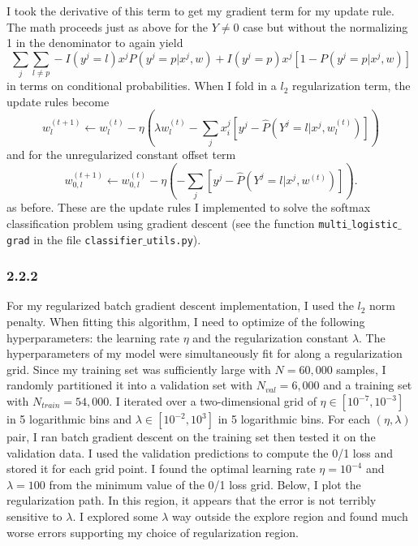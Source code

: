 \documentclass[12pt]{amsart}
\begin{document}
I took the derivative of this term to get my gradient term for my update rule.  The math proceeds just as above for the $Y \neq 0$ case but without the normalizing 1 in the denominator to again yield
\begin{equation}
\sum_j \sum_{l \neq p} -I(y^j = l) x^j P(y^j = p | x^j, w) + I(y^j = p) x^j \left[1 - P(y^j = p | x^j, w) \right]
\end{equation}
in terms on conditional probabilities.  When I fold in a $l_2$ regularization term, the update rules become
 \begin{equation}
w^{(t+1)}_l \leftarrow w^{(t)}_l - \eta (\lambda w^{(t)}_l - \sum_j x^j_i[y^j - \hat{P}(Y^j = l | x^j, w_l^{(t)})])
\end{equation}
and for the unregularized constant offset term
\begin{equation}
w^{(t+1)}_{0,l} \leftarrow w^{(t)}_{0,l} - \eta (- \sum_j[y^j - \hat{P}(Y^j = l | x^j, w^{(t)})]).
\end{equation}
as before.  These are the update rules I implemented to solve the softmax classification problem using gradient descent (see the function {\tt multi$\_$logistic$\_$grad} in the file {\tt classifier$\_$utils.py}).

\subsubsection*{2.2.2}

For my regularized batch gradient descent implementation, I used the $l_2$ norm penalty.  When fitting this algorithm, I need to optimize of the following hyperparameters: the learning rate $\eta$ and the regularization constant $\lambda$.  The hyperparameters of my model were simultaneously fit for along a regularization grid.  Since my training set was sufficiently large with $N = 60,000$ samples, I randomly partitioned it into a validation set with $N_{val} = 6,000$ and a training set with $N_{train} = 54,000$.  I iterated over a two-dimensional grid of $\eta \in [10^{-7},10^{-3}]$ in 5 logarithmic bins and $\lambda \in [10^{-2},10^{3}]$ in 5 logarithmic bins.  For each $(\eta,\lambda)$ pair, I ran batch gradient descent on the training set then tested it on the validation data.  I used the validation predictions to compute the 0/1 loss and stored it for each grid point.  I found the optimal learning rate $\eta = 10^{-4}$ and $\lambda = 100$ from the minimum value of the 0/1 loss grid.  Below, I plot the regularization path.  In this region, it appears that the error is not terribly sensitive to $\lambda$.  I explored some $\lambda$ way outside the explore region and found much worse errors supporting my choice of regularization region.
\end{document}
